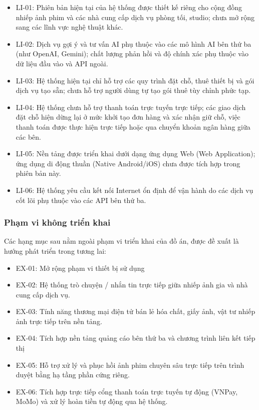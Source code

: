 \begin{itemize}
	\item LI-01: Phiên bản hiện tại của hệ thống được thiết kế riêng cho cộng đồng nhiếp ảnh phim và các nhà cung cấp dịch vụ phòng tối, studio; chưa mở rộng sang các lĩnh vực nghệ thuật khác.
	\item LI-02: Dịch vụ gợi ý và tư vấn AI phụ thuộc vào các mô hình AI bên thứ ba (như OpenAI, Gemini); chất lượng phản hồi và độ chính xác phụ thuộc vào dữ liệu đầu vào và API ngoài.
	\item LI-03: Hệ thống hiện tại chỉ hỗ trợ các quy trình đặt chỗ, thuê thiết bị và gói dịch vụ tạo sẵn; chưa hỗ trợ người dùng tự tạo gói thuê tùy chỉnh phức tạp.
	\item LI-04: Hệ thống chưa hỗ trợ thanh toán trực tuyến trực tiếp; các giao dịch đặt chỗ hiện dừng lại ở mức khởi tạo đơn hàng và xác nhận giữ chỗ, việc thanh toán được thực hiện trực tiếp hoặc qua chuyển khoản ngân hàng giữa các bên.
	\item LI-05: Nền tảng được triển khai dưới dạng ứng dụng Web (Web Application); ứng dụng di động thuần (Native Android/iOS) chưa được tích hợp trong phiên bản này.
	\item LI-06: Hệ thống yêu cầu kết nối Internet ổn định để vận hành do các dịch vụ cốt lõi phụ thuộc vào các API bên thứ ba.
	
\end{itemize}

\subsubsection{Phạm vi không triển khai}
Các hạng mục sau nằm ngoài phạm vi triển khai của đồ án, được đề xuất là hướng phát triển trong tương lai:
\begin{itemize}
	\item EX-01: Mở rộng phạm vi thiết bị sử dụng
	\item EX-02: Hệ thống trò chuyện / nhắn tin trực tiếp giữa nhiếp ảnh gia và nhà cung cấp dịch vụ.
	\item EX-03: Tính năng thương mại điện tử bán lẻ hóa chất, giấy ảnh, vật tư nhiếp ảnh trực tiếp trên nền tảng.
	\item EX-04: Tích hợp nền tảng quảng cáo bên thứ ba và chương trình liên kết tiếp thị
	\item EX-05: Hỗ trợ xử lý và phục hồi ảnh phim chuyên sâu trực tiếp trên trình duyệt bằng hạ tầng phần cứng riêng.
	\item EX-06: Tích hợp trực tiếp cổng thanh toán trực tuyến tự động (VNPay, MoMo) và xử lý hoàn tiền tự động qua hệ thống.
\end{itemize}
